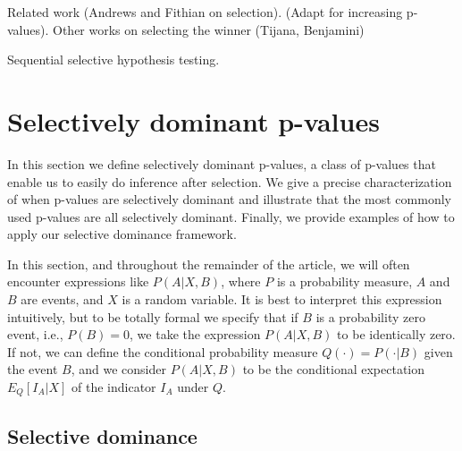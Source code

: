 \documentclass{article}
\begin{document}
Related work (Andrews and Fithian on selection). (Adapt for increasing p-values). Other works on selecting the winner (Tijana, Benjamini) 

Sequential selective hypothesis testing. 


\section{Selectively dominant p-values}
\label{sec:dominance}

In this section we define selectively dominant p-values, a class of p-values that enable us to easily do inference after selection. We give a precise characterization of when p-values are selectively dominant and illustrate that the most commonly used p-values are all selectively dominant. Finally, we provide examples of how to apply our selective dominance framework. 

In this section, and throughout the remainder of the article, we will often encounter expressions like $P(A|X, B)$, where $P$ is a probability measure, $A$ and $B$ are events, and $X$ is a random variable. It is best to interpret this expression intuitively, but to be totally formal we specify that if $B$ is a probability zero event, i.e., $P(B) = 0$, we take the expression $P(A|X, B)$ to be identically zero. If not, we can define the conditional probability measure $Q(\cdot) = P(\cdot| B)$ given the event $B$, and we consider $P(A | X, B)$ to be the conditional expectation $E_Q[I_A| X]$ of the indicator $I_A$ under $Q$. %

\subsection{Selective dominance}
\end{document}
